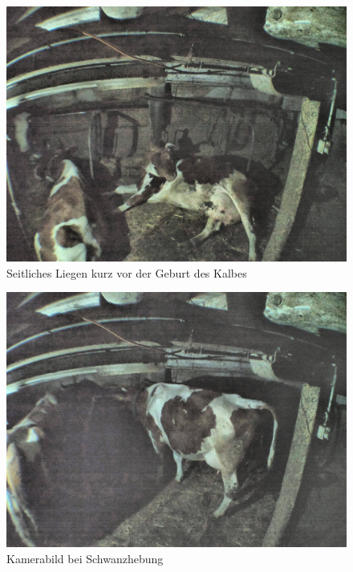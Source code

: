 \begin{figure}[h]
	\center
	\includegraphics[scale=0.45]{Grafiken/seitlichesligen.jpg}
	\caption{Seitliches Liegen kurz vor der Geburt des Kalbes} 
	\label{fig: Seitliches Liegen kurz vor der Geburt des Kalbes}
\end{figure}


\begin{figure}[h]
	\center
	\includegraphics[scale=0.45]{Grafiken/schwanhebungkamerabild.jpg}
	\caption{Kamerabild bei Schwanzhebung} 
	\label{fig: Kamerabild bei Schwanzhebung}
\end{figure}

